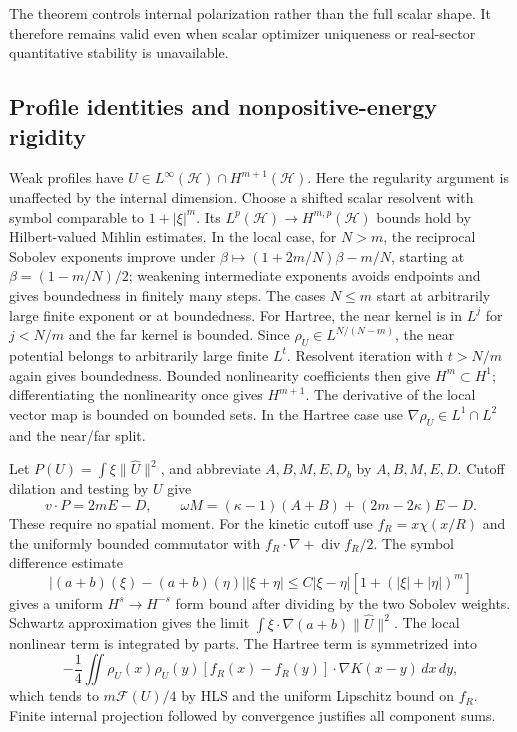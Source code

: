 The theorem controls internal polarization rather than the full
scalar shape. It therefore remains valid even when scalar optimizer
uniqueness or real-sector quantitative stability is unavailable.

\subsection{Profile identities and nonpositive-energy rigidity}
Weak profiles have $U\in L^\infty(\mathcal H)\cap H^{m+1}(\mathcal H)$.
Here the regularity argument is unaffected by the internal dimension.
Choose a shifted scalar resolvent with symbol comparable to
$1+|\xi|^m$. Its $L^p(\mathcal H)\to H^{m,p}(\mathcal H)$ bounds
hold by Hilbert-valued Mihlin estimates. In the local case, for
$N>m$, the reciprocal Sobolev exponents improve under
$\beta\mapsto(1+2m/N)\beta-m/N$, starting at
$\beta=(1-m/N)/2$; weakening intermediate exponents avoids endpoints
and gives boundedness in finitely many steps. The cases $N\le m$
start at arbitrarily large finite exponent or at boundedness.
For Hartree, the near kernel is in $L^j$ for $j<N/m$ and the far
kernel is bounded. Since $\rho_U\in L^{N/(N-m)}$, the near potential
belongs to arbitrarily large finite $L^t$. Resolvent iteration with
$t>N/m$ again gives boundedness. Bounded nonlinearity coefficients
then give $H^m\subset H^1$; differentiating the nonlinearity once
gives $H^{m+1}$. The derivative of the local vector map is bounded
on bounded sets. In the Hartree case use
$\nabla\rho_U\in L^1\cap L^2$ and the near/far split.

Let $P(U)=\int\xi\|\widehat U\|^2$, and abbreviate $A,B,M,E,D_b$
by $A,B,M,E,D$. Cutoff dilation and testing by $U$ give
\begin{equation}\label{eq:r11-vectorpohoz}
 v\cdot P=2mE-D,\qquad
 \omega M=(\kappa-1)(A+B)+(2m-2\kappa)E-D.
\end{equation}
These require no spatial moment. For the kinetic cutoff use
$f_R=x\chi(x/R)$ and the uniformly bounded commutator with
$f_R\cdot\nabla+\operatorname{div}f_R/2$.
The symbol difference estimate
\[
 |(a+b)(\xi)-(a+b)(\eta)||\xi+\eta|
 \le C|\xi-\eta|[1+(|\xi|+|\eta|)^m]
\]
gives a uniform $H^s\to H^{-s}$ form bound after dividing by the
two Sobolev weights. Schwartz approximation gives the limit
$\int\xi\cdot\nabla(a+b)\|\widehat U\|^2$.
The local nonlinear term is integrated by parts. The Hartree term
is symmetrized into
\[
 -\frac14\iint\rho_U(x)\rho_U(y)
    [f_R(x)-f_R(y)]\cdot\nabla K(x-y)\,dx\,dy,
\]
which tends to $m\mathcal F(U)/4$ by HLS and the uniform Lipschitz
bound on $f_R$. Finite internal projection followed by convergence
justifies all component sums.

